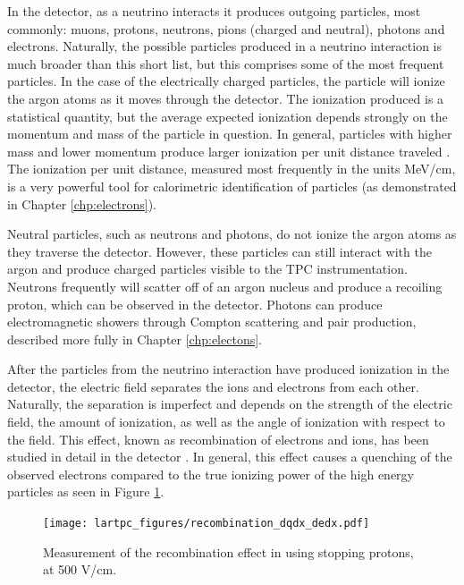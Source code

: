 In the detector, as a neutrino interacts it produces outgoing particles, most commonly: muons, protons, neutrons, pions (charged and neutral), photons and electrons.  Naturally, the possible particles produced in a neutrino interaction is much broader than this short list, but this comprises some of the most frequent particles.  In the case of the electrically charged particles, the particle will ionize the argon atoms as it moves through the detector.  The ionization produced is a statistical quantity, but the average expected ionization depends strongly on the momentum and mass of the particle in question.  In general, particles with higher mass and lower momentum produce larger ionization per unit distance traveled \cite{bethe-bloch}.  The ionization per unit distance, measured most frequently in the units MeV/cm, is a very powerful tool for calorimetric identification of particles (as demonstrated in Chapter \ref{chp:electrons}).

Neutral particles, such as neutrons and photons, do not ionize the argon atoms as they traverse the detector.  However, these particles can still interact with the argon and produce charged particles visible to the TPC instrumentation.  Neutrons frequently will scatter off of an argon nucleus and produce a recoiling proton, which can be observed in the detector.  Photons can produce electromagnetic showers through Compton scattering and pair production, described more fully in Chapter \ref{chp:electons}.

After the particles from the neutrino interaction have produced ionization in the detector, the electric field separates the ions and electrons from each other.  Naturally, the separation is imperfect and depends on the strength of the electric field, the amount of ionization, as well as the angle of ionization with respect to the field.  This effect, known as recombination of electrons and ions, has been studied in detail in the \argoneut detector \cite{Acciarri:2013met}.  In general, this effect causes a quenching of the observed electrons compared to the true ionizing power of the high energy particles as seen in Figure \ref{fig:argoneut_recombination}.

\begin{figure}[htbp]
  \centering
  \texttt{[image: lartpc\_figures/recombination\_dqdx\_dedx.pdf]}
  \caption[\argoneut Recombination]{Measurement of the recombination effect in \argoneut using stopping protons, at 500 V/cm. \cite{Acciarri:2013met}}
  \label{fig:argoneut_recombination}
\end{figure}

